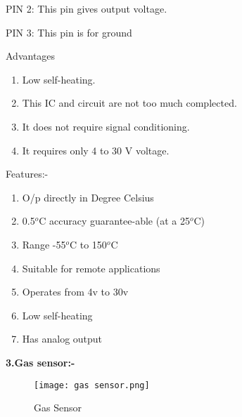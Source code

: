 \documentclass[12pt,a4paper]{report}
\begin{document}
\noindent PIN 2: This pin gives output voltage.

\noindent PIN 3: This pin is for ground

\noindent Advantages 

\begin{enumerate}
\item  Low self-heating.

\item  This IC and circuit are not too much complected.

\item  It does not require signal conditioning.

\item  It requires only 4 to 30 V voltage.
\end{enumerate}

\noindent Features:-

\begin{enumerate}
\item  O/p directly in Degree Celsius 

\item  0.5${}^{o}$C accuracy guarantee-able (at a 25${}^{o}$C)

\item  Range -55${}^{o}$C to 150${}^{o}$C

\item  Suitable for remote applications 

\item  Operates from 4v to 30v

\item  Low self-heating 

\item  Has analog output 
\end{enumerate}

\noindent 

\noindent 
\newline\textbf{3.Gas sensor:-}
\begin{figure}[htp]
    \texttt{[image: gas sensor.png]}
    \caption{Gas Sensor }
\end{figure}

\noindent \textbf{}

\noindent \textbf{}

\noindent \textbf{}

\noindent \textbf{}

\noindent \textbf{}

\noindent \textbf{}

\noindent \textbf{}
\end{document}

